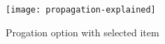  
 	\begin{figure} 
 		\centering
 		\texttt{[image: propagation-explained]}
 		\caption{Progation option with selected item}
 		\label{fig:propagation-explained}
 	\end{figure}
 